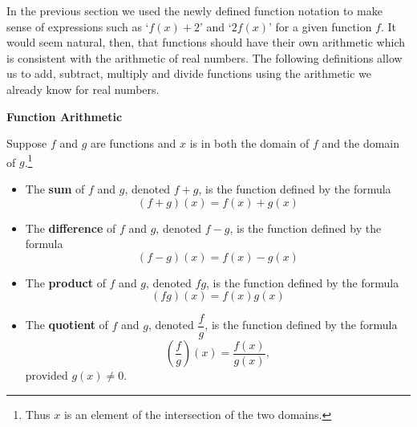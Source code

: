 

\setcounter{footnote}{0}

\label{FunctionArithmetic}

In the previous section we used the newly defined function notation to make sense of expressions such as `$f(x) + 2$' and `$2f(x)$' for a given function $f$.  It would seem natural, then, that functions should have their own arithmetic which is consistent with the arithmetic of real numbers.  The following definitions allow us to add, subtract, multiply and divide functions using the arithmetic we already know for real numbers.

\medskip

\colorbox{ResultColor}{\bbm


\centerline{\textbf{Function Arithmetic}} 

\smallskip

\hspace{.17in} Suppose $f$ and $g$ are functions and $x$ is in both the domain of $f$ and the domain of $g$.\footnote{Thus $x$ is an element of the intersection of the two domains.}

\begin{itemize}

\item  The  \textbf{sum} of $f$ and $g$, denoted $f+g$, is the function defined by the formula \[(f+g)(x) = f(x) + g(x)\]

\item  The  \textbf{difference} of $f$ and $g$, denoted $f-g$, is the function defined by the formula \[(f-g)(x) = f(x) - g(x)\]

\item  The  \textbf{product} of $f$ and $g$, denoted $fg$, is the function defined by the formula \[(fg)(x) = f(x)g(x)\]

\item  The  \textbf{quotient} of $f$ and $g$, denoted $\dfrac{f}{g}$, is the function defined by the formula \[\left(\dfrac{f}{g}\right)(x) = \dfrac{f(x)}{g(x)},\] provided $g(x) \neq 0$.

\end{itemize}

\ebm}

\medskip

